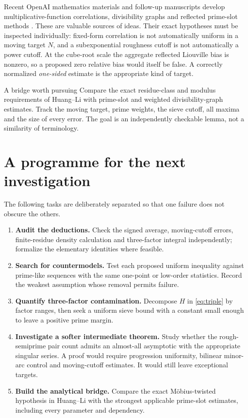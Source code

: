 \documentclass[11pt,a4paper]{article}
\begin{document}
Recent OpenAI mathematics materials and follow-up manuscripts develop multiplicative-function correlations, divisibility graphs and reflected prime-slot methods \cite{oaimath,followups}. These are valuable sources of ideas. Their exact hypotheses must be inspected individually: fixed-form correlation is not automatically uniform in a moving target $N$, and a subexponential roughness cutoff is not automatically a power cutoff. At the cube-root scale the aggregate reflected Liouville bias is nonzero, so a proposed zero relative bias would itself be false. A correctly normalized \emph{one-sided} estimate is the appropriate kind of target.

\begin{insight}{A bridge worth pursuing}
Compare the exact residue-class and modulus requirements of Huang--Li with prime-slot and weighted divisibility-graph estimates. Track the moving target, prime weights, the sieve cutoff, all maxima and the size of every error. The goal is an independently checkable lemma, not a similarity of terminology.
\end{insight}

\section{A programme for the next investigation}
The following tasks are deliberately separated so that one failure does not obscure the others.
\begin{enumerate}[leftmargin=*,itemsep=3pt]
\item \textbf{Audit the deductions.} Check the signed average, moving-cutoff errors, finite-residue density calculation and three-factor integral independently; formalize the elementary identities where feasible.
\item \textbf{Search for countermodels.} Test each proposed uniform inequality against prime-like sequences with the same one-point or low-order statistics. Record the weakest assumption whose removal permits failure.
\item \textbf{Quantify three-factor contamination.} Decompose $H$ in \eqref{eq:triple} by factor ranges, then seek a uniform sieve bound with a constant small enough to leave a positive prime margin.
\item \textbf{Investigate a softer intermediate theorem.} Study whether the rough-semiprime pair count admits an almost-all asymptotic with the appropriate singular series. A proof would require progression uniformity, bilinear minor-arc control and moving-cutoff estimates. It would still leave exceptional targets.
\item \textbf{Build the analytical bridge.} Compare the exact M\"obius-twisted hypothesis in Huang--Li with the strongest applicable prime-slot estimates, including every parameter and dependency.
\end{enumerate}
\end{document}
